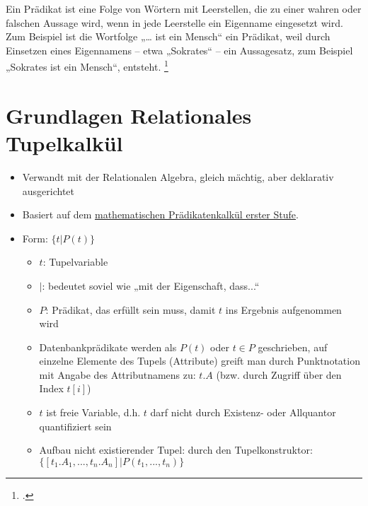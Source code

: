 \documentclass{lehramt-informatik}
\begin{document}
Ein Prädikat ist eine Folge von Wörtern mit Leerstellen, die zu einer
wahren oder falschen Aussage wird, wenn in jede Leerstelle ein Eigenname
eingesetzt wird. Zum Beispiel ist die Wortfolge „… ist ein Mensch“ ein
Prädikat, weil durch Einsetzen eines Eigennamens – etwa „Sokrates“ – ein
Aussagesatz, zum Beispiel „Sokrates ist ein Mensch“, entsteht.
\footcite{wiki:praedikatenlogik}

%

\section{Grundlagen Relationales Tupelkalkül}

\begin{itemize}
\item Verwandt mit der Relationalen Algebra, gleich mächtig, aber
deklarativ ausgerichtet

\item Basiert auf dem
\href{https://de.wikipedia.org/wiki/Pr%C3%A4dikatenlogik_erster_Stufe}
{mathematischen Prädikatenkalkül erster Stufe}.

\item Form: $\{t | P(t)\}$

\begin{itemize}
\item $t$: Tupelvariable

\item $|$: bedeutet soviel wie „mit der Eigenschaft, dass...“

\item $P$: Prädikat, das erfüllt sein muss, damit $t$ ins Ergebnis
aufgenommen wird

\item Datenbankprädikate werden als $P(t)$ oder $t \in P$ geschrieben,
auf einzelne Elemente des Tupels (Attribute) greift man durch
Punktnotation mit Angabe des Attributnamens zu: $t.A$ (bzw. durch
Zugriff über den Index $t[i]$)

\item $t$ ist freie Variable, d.h. $t$ darf nicht durch Existenz- oder
Allquantor quantifiziert sein

\item Aufbau nicht existierender Tupel: durch den Tupelkonstruktor:
$\{[t_1.A_1,...,t_n.A_n] | P(t_1,...,t_n)\}$

\end{itemize}
\end{itemize}
\end{document}
